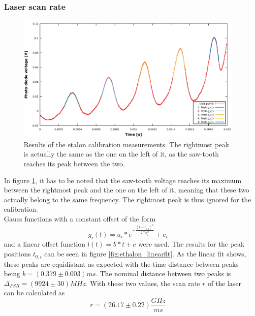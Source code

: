 \subsubsection*{Laser scan rate}
\begin{figure}[htb]
\centering
\includegraphics[width=1.0\linewidth]{graphics/etalon_fit}
\caption[Etalon peaks]{Results of the etalon calibration measurements. The rightmost peak is actually the same as the one on the left of it, as the saw-tooth reaches its peak between the two.}
\label{fig:etalon_fit}
\end{figure}
In figure \ref{fig:etalon_fit}, it has to be noted that the saw-tooth voltage reaches its maximum between the rightmost peak and the one on the left of it, meaning that these two actually belong to the same frequency. The rightmost peak is thus ignored for the calibration.\\
Gauss functions with a constant offset of the form
\begin{equation}
	g_i(t)=a_i*e^{-\frac{(t-t_{0,i})^2}{2*\sigma_i^2}}+c_i
	\label{eq:gaussfit}
\end{equation}
and a linear offset function $l(t)=b*t+c$ were used. 
The results for the peak positions $t_{0,i}$ can be seen in figure \ref{fig:ethalon_linearfit}. As the linear fit shows, these peaks are equidistant as expected with the time distance between peaks being $b=\unit{(0.379\pm0.003)}{ms}$. The nominal distance between two peaks is $\Delta_{FSR}=\unit{(9924\pm30)}{MHz}$. With these two values, the scan rate $r$ of the laser can be calculated as
\begin{equation}
	r=\unit{(26.17\pm 0.22)}{\frac{GHz}{ms}}
\end{equation}

